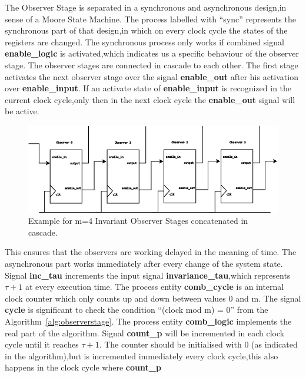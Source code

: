 The Observer Stage is separated in a synchronous and asynchronous design,in sense of a Moore State Machine.
The process labelled with ``sync'' represents the synchronous part of that design,in which on every clock cycle 
the states of the registers are changed.
The synchronous process only works if combined signal \textbf{enable\_logic} is activated,which indicates us a specific behaviour of the 
observer stage. The observer stages are connected in cascade to each other. The first stage activates the next observer stage over the signal
\textbf{enable\_out} after his activation over \textbf{enable\_input}.
If an activate state of \textbf{enable\_input} is recognized in the current clock cycle,only then in the next clock cycle the \textbf{enable\_out} signal will
be active.   
%
\begin{center}
\begin{figure}[h]
\label{fig:observerstages}
\includegraphics[width=450px]{Chapter2/Figs/Raster/Observer-stage.png}
\caption[Invariant Observer stages in cascade , m=4]{Example for m=4 Invariant Observer Stages concatenated in cascade. }
\end{figure}
\end{center}
This ensures that the observers are working delayed in the meaning of time.
The asynchronous part works immediately after every change of the system state.  
Signal \textbf{inc\_tau} increments the input signal \textbf{invariance\_tau},which represents $\tau+1$ at every execution time.
The process entity \textbf{comb\_cycle} is an internal clock counter which only counts up and down between values 0 and m.
The signal \textbf{cycle} is significant to check the condition ``(clock mod m) = 0'' from the Algorithm~\ref{alg:observerstage}.
The process entity \textbf{comb\_logic} implements the real part of the algorithm.
Signal \textbf{count\_p} will be incremented in each clock cycle until it reaches $\tau+1$.
The counter should be initialised with 0 (as indicated in the algorithm),but is incremented immediately every clock cycle,this also happens in the clock cycle where \textbf{count\_p}
